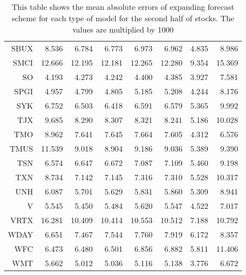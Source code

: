 \begin{table}[ht]
\begin{tabular}{rrrrrrrr}
  SBUX & 8.536 & 6.784 & 6.773 & 6.973 & 6.962 & 4.835 & 8.986 \\ 
  SMCI & 12.666 & 12.195 & 12.181 & 12.265 & 12.280 & 9.354 & 15.369 \\ 
  SO & 4.193 & 4.273 & 4.242 & 4.400 & 4.385 & 3.927 & 7.581 \\ 
  SPGI & 4.957 & 4.799 & 4.805 & 5.185 & 5.208 & 4.244 & 8.176 \\ 
  SYK & 6.752 & 6.503 & 6.418 & 6.591 & 6.579 & 5.365 & 9.992 \\ 
  TJX & 9.685 & 8.290 & 8.307 & 8.321 & 8.241 & 5.186 & 10.028 \\ 
  TMO & 8.962 & 7.641 & 7.645 & 7.664 & 7.605 & 4.312 & 6.576 \\ 
  TMUS & 11.539 & 9.018 & 8.904 & 9.186 & 9.036 & 5.389 & 9.390 \\ 
  TSN & 6.574 & 6.647 & 6.672 & 7.087 & 7.109 & 5.460 & 9.198 \\ 
  TXN & 8.734 & 7.142 & 7.145 & 7.316 & 7.310 & 5.528 & 10.317 \\ 
  UNH & 6.087 & 5.701 & 5.629 & 5.831 & 5.860 & 5.309 & 8.941 \\ 
  V & 5.545 & 5.450 & 5.484 & 5.620 & 5.547 & 4.522 & 7.017 \\ 
  VRTX & 16.281 & 10.409 & 10.414 & 10.553 & 10.512 & 7.188 & 10.792 \\ 
  WDAY & 6.651 & 7.467 & 7.544 & 7.760 & 7.919 & 6.172 & 8.357 \\ 
  WFC & 6.473 & 6.480 & 6.501 & 6.856 & 6.882 & 5.811 & 11.406 \\ 
  WMT & 5.662 & 5.012 & 5.036 & 5.116 & 5.138 & 3.776 & 6.672 \\ 
   \hline
\end{tabular}
\caption[MAE expanding forecast (2)]{This table shows the mean absolute errors of expanding forecast scheme for each type of model for the second half of stocks. 
                     The values are multiplied by 1000} 
\label{Table:MAE_e_2}
\end{table}
